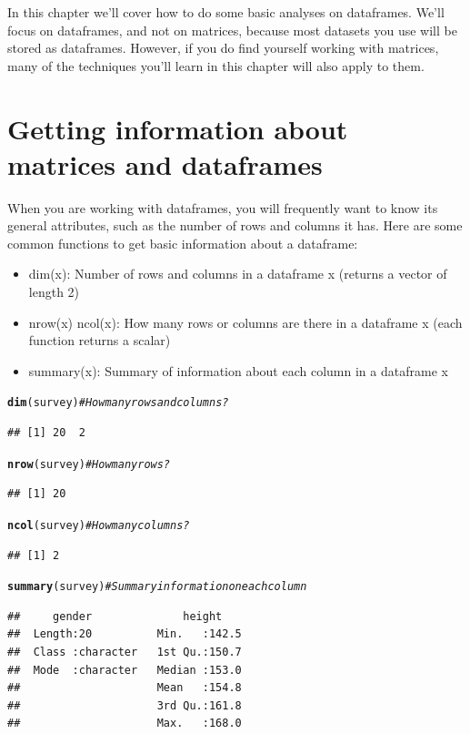 \documentclass{tufte-book}\usepackage[]{graphicx}\usepackage[]{color}
\makeatletter
\newcommand{\hlcom}[1]{\textcolor[rgb]{0.678,0.584,0.686}{\textit{#1}}}%
\newcommand{\hlstd}[1]{\textcolor[rgb]{0.345,0.345,0.345}{#1}}%
\newcommand{\hlkwd}[1]{\textcolor[rgb]{0.737,0.353,0.396}{\textbf{#1}}}%
\newenvironment{kframe}{%
 \def\at@end@of@kframe{}%
 \ifinner\ifhmode%
  \def\at@end@of@kframe{\end{minipage}}%
  \begin{minipage}{\columnwidth}%
 \fi\fi%
 \def\FrameCommand##1{\hskip\@totalleftmargin \hskip-\fboxsep
 \colorbox{shadecolor}{##1}\hskip-\fboxsep
     \hskip-\linewidth \hskip-\@totalleftmargin \hskip\columnwidth}%
 \MakeFramed {\advance\hsize-\width
   \@totalleftmargin\z@ \linewidth\hsize
   \@setminipage}}%
 {\par\unskip\endMakeFramed%
 \at@end@of@kframe}
\newenvironment{knitrout}{}{} %
\makeatother
\begin{document}
\begin{footnotesize}
In this chapter we'll cover how to do some basic analyses on dataframes. We'll focus on dataframes, and not on matrices, because most datasets you use will be stored as dataframes. However, if you do find yourself working with matrices, many of the techniques you'll learn in this chapter will also apply to them.


\section{Getting information about matrices and dataframes}

When you are working with dataframes, you will frequently want to know its general attributes, such as the number of rows and columns it has. Here are some common functions to get basic information about a dataframe:

\begin{itemize}
  \item dim(x): Number of rows and columns in a dataframe x (returns a vector of length 2)
  \item nrow(x) ncol(x): How many rows or columns are there in a dataframe x (each function returns a scalar)
  \item summary(x): Summary of information about each column in a dataframe x
\end{itemize}


\begin{footnotesize}
\begin{knitrout}
\color{fgcolor}\begin{kframe}
\begin{alltt}
\hlkwd{dim}\hlstd{(survey)} \hlcom{# How many rows and columns?}
\end{alltt}
\begin{verbatim}
## [1] 20  2
\end{verbatim}
\begin{alltt}
\hlkwd{nrow}\hlstd{(survey)} \hlcom{# How many rows?}
\end{alltt}
\begin{verbatim}
## [1] 20
\end{verbatim}
\begin{alltt}
\hlkwd{ncol}\hlstd{(survey)} \hlcom{# How many columns?}
\end{alltt}
\begin{verbatim}
## [1] 2
\end{verbatim}
\begin{alltt}
\hlkwd{summary}\hlstd{(survey)} \hlcom{# Summary information on each column}
\end{alltt}
\begin{verbatim}
##     gender              height     
##  Length:20          Min.   :142.5  
##  Class :character   1st Qu.:150.7  
##  Mode  :character   Median :153.0  
##                     Mean   :154.8  
##                     3rd Qu.:161.8  
##                     Max.   :168.0
\end{verbatim}
\end{kframe}
\end{knitrout}
\end{footnotesize}


\end{footnotesize}
\end{document}
